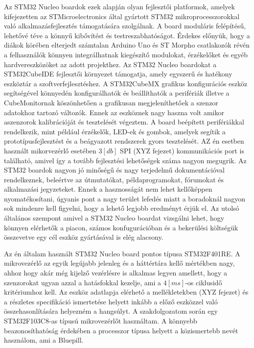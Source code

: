 
Az STM32 Nucleo boardok ezek alapján olyan fejlesztői platformok, amelyek kifejezetten az STMicroelectronics által gyártott STM32 mikroprocesszorokkal való alkalmazásfejlesztés támogatására szolgálnak. A board moduláris felépítésű, lehetővé téve a könnyű kibővítést és testreszabhatóságot. Érdekes előnyük, hogy a diákok körében elterjedt számtalan Arduino Uno és ST Morpho csatlakozók révén a felhasználók könnyen integrálhatnak kiegészítő modulokat, érzékelőket és egyéb hardvereszközöket az adott projekthez. Az STM32 Nucleo boardokat a STM32CubeIDE fejlesztői környezet támogatja, amely egyszerű és hatékony eszköztár a szoftverfejlesztéshez. A STM32CubeMX grafikus konfigurációs eszköz segítségével könnyedén konfigurálhatók és beállíthatók a perifériák illetve a CubeMonitornak köszönhetően a grafikusan megjeleníthetőek a szenzor adatokhoz tartozó változók. Ennek az eszköznek nagy haszna volt amikor aszenzorok kalibrációját és tesztelését végeztem. A board beépített perifériákkal rendelkezik, mint például érzékelők, LED-ek és gombok, amelyek segítik a prototípusfejlesztést és a beágyazott rendszerek gyors tesztelését. AZ én esetben használt mikorvezérlő esetében $3[db]$ SPI (XYZ fejezet) kommunikációs port is található, amivel így a tovább fejlesztési lehetőségek száma nagyon megugrik. Az STM32 boardok nagyon jó minőségű és nagy terjedelmű dokumentációval rendelkeznek, beleértve az útmutatókat, példaprogramokat, fórumokat és alkalmazási jegyzeteket. Ennek a hasznosságát nem lehet kellőképpen nyomatékosítani, úgyanis pont a nagy terület lefedés miatt a boradoknál nagyon sok mindenre kell figyelni, hogy a lehető legjobb eredményt érjük el. Az utolsó általános szempont amivel a STM32 Nucleo boardat vizsgálni lehet, hogy könnyen elérhetők a piacon, számos konfugurációban és a bekerülési költségük összevetve egy cél eszköz gyártásával is elég alacsony.

Az én általam használt STM32 Nucleo board pontos típusa STM32F401RE. A mikrovezérlő az egyik legújabb jelenleg és a háttértára kellő mértékben nagy, ahhoz hogy akár még kijelző vezérlésre is alkalmas legyen amellett, hogy a szenzorokat ugyan azzal a hatásfokkal kezelje, ami a $4[ms]$-os ciklusidő kritériumhoz kell. Az eszköz adatlapja elérhető a mellékletekben (XYZ fejezet) és a részletes specifikáció ismertetése helyett inkább a előző eszközzel való összehasonlítására helyezném a hangsúlyt. A szakdolgozatom során egy STM32F103C8-as típusú mikrovezérlőt használtam. A könnyebb beazonosíthatóság érdekében a processzor típusa helyett a közismertebb nevét használom, ami a Bluepill.

